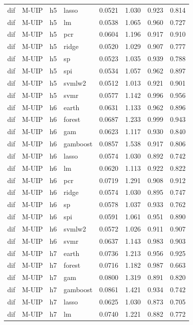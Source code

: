 \begin{ThreePartTable}
\begin{longtable}[t]{llclcccc}
dif & M-UIP & h5 & lasso & 0.0521 & 1.030 & 0.923 & 0.814\\
dif & M-UIP & h5 & lm & 0.0538 & 1.065 & 0.960 & 0.727\\
dif & M-UIP & h5 & pcr & 0.0604 & 1.196 & 0.917 & 0.910\\
dif & M-UIP & h5 & ridge & 0.0520 & 1.029 & 0.907 & 0.777\\
dif & M-UIP & h5 & sp & 0.0523 & 1.035 & 0.939 & 0.788\\
dif & M-UIP & h5 & spi & 0.0534 & 1.057 & 0.962 & 0.897\\
dif & M-UIP & h5 & svmlw2 & 0.0512 & 1.013 & 0.921 & 0.901\\
dif & M-UIP & h5 & svmr & 0.0577 & 1.142 & 0.996 & 0.956\\
\addlinespace
dif & M-UIP & h6 & earth & 0.0631 & 1.133 & 0.962 & 0.896\\
dif & M-UIP & h6 & forest & 0.0687 & 1.233 & 0.999 & 0.943\\
dif & M-UIP & h6 & gam & 0.0623 & 1.117 & 0.930 & 0.840\\
dif & M-UIP & h6 & gamboost & 0.0857 & 1.538 & 0.917 & 0.806\\
dif & M-UIP & h6 & lasso & 0.0574 & 1.030 & 0.892 & 0.742\\
dif & M-UIP & h6 & lm & 0.0620 & 1.113 & 0.922 & 0.822\\
dif & M-UIP & h6 & pcr & 0.0719 & 1.291 & 0.908 & 0.912\\
dif & M-UIP & h6 & ridge & 0.0574 & 1.030 & 0.895 & 0.747\\
dif & M-UIP & h6 & sp & 0.0578 & 1.037 & 0.933 & 0.762\\
dif & M-UIP & h6 & spi & 0.0591 & 1.061 & 0.951 & 0.890\\
dif & M-UIP & h6 & svmlw2 & 0.0572 & 1.026 & 0.911 & 0.907\\
dif & M-UIP & h6 & svmr & 0.0637 & 1.143 & 0.983 & 0.903\\
\addlinespace
dif & M-UIP & h7 & earth & 0.0736 & 1.213 & 0.956 & 0.925\\
dif & M-UIP & h7 & forest & 0.0716 & 1.182 & 0.987 & 0.663\\
dif & M-UIP & h7 & gam & 0.0800 & 1.319 & 0.891 & 0.820\\
dif & M-UIP & h7 & gamboost & 0.0861 & 1.421 & 0.934 & 0.742\\
dif & M-UIP & h7 & lasso & 0.0625 & 1.030 & 0.873 & 0.705\\
dif & M-UIP & h7 & lm & 0.0740 & 1.221 & 0.882 & 0.772\\

\end{longtable}
\end{ThreePartTable}
